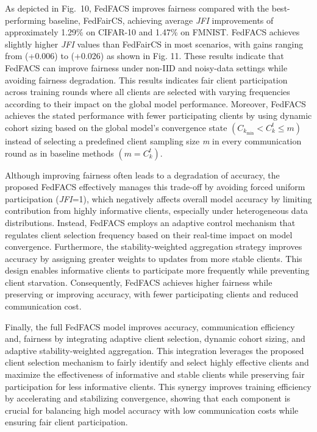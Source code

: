 \documentclass[pdflatex,sn-mathphys-num,oneside]{sn-jnl}%
\theoremstyle{thmstyleone}%
\theoremstyle{thmstyletwo}%
\theoremstyle{thmstylethree}%
\begin{document}
As depicted in Fig.~10, FedFACS improves fairness compared with the best-performing baseline, FedFairCS, achieving average \textit{JFI} improvements of approximately 1.29\% on CIFAR-10 and 1.47\% on FMNIST. FedFACS achieves slightly higher \textit{JFI} values than FedFairCS in most scenarios, with gains ranging from (+0.006) to (+0.026) as shown in Fig. 11. These results indicate that FedFACS can improve fairness under non-IID and noisy-data settings while avoiding fairness degradation. This results indicates fair client participation across training rounds where all clients are selected with varying frequencies according to their impact on the global model performance. Moreover, FedFACS achieves the stated performance with fewer participating clients by using dynamic cohort sizing based on the global model’s convergence state $(C_{k_{\min}} < C_k^t \le m)$ instead of selecting a predefined client sampling size \textit{m} in every communication round as in baseline methods $(m = C_k^t)$. 


Although improving fairness often leads to a degradation of accuracy, the proposed FedFACS effectively manages this trade-off by avoiding forced uniform participation (\textit{JFI}=1), which negatively affects overall model accuracy by limiting contribution from highly informative clients, especially under heterogeneous data distributions. Instead, FedFACS employs an adaptive control mechanism that regulates client selection frequency based on their real-time impact on model convergence. Furthermore, the stability-weighted aggregation strategy improves accuracy by assigning greater weights to updates from more stable clients. This design enables informative clients to participate more frequently while preventing client starvation. Consequently, FedFACS achieves higher fairness while preserving or improving accuracy, with fewer participating clients and reduced communication cost.


Finally, the full FedFACS model improves accuracy, communication efficiency and, fairness by integrating adaptive client selection, dynamic cohort sizing, and adaptive stability-weighted aggregation. This integration leverages the proposed client selection mechanism to fairly identify and select highly effective clients and maximize the effectiveness of informative and stable clients while preserving fair participation for less informative clients. This synergy improves training efficiency by accelerating and stabilizing convergence, showing that each component is crucial for balancing high model accuracy with low communication costs while ensuring fair client participation.
\end{document}
